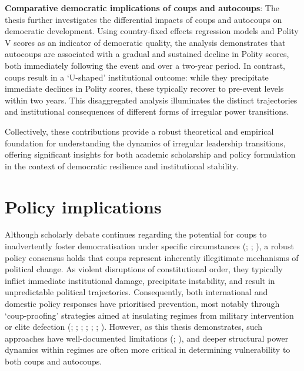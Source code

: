 \documentclass[
  12pt,
]{report}
\begin{document}
\textbf{Comparative democratic implications of coups and autocoups}: The
thesis further investigates the differential impacts of coups and
autocoups on democratic development. Using country-fixed effects
regression models and Polity V scores as an indicator of democratic
quality, the analysis demonstrates that autocoups are associated with a
gradual and sustained decline in Polity scores, both immediately
following the event and over a two-year period. In contrast, coups
result in a `U-shaped' institutional outcome: while they precipitate
immediate declines in Polity scores, these typically recover to
pre-event levels within two years. This disaggregated analysis
illuminates the distinct trajectories and institutional consequences of
different forms of irregular power transitions.

Collectively, these contributions provide a robust theoretical and
empirical foundation for understanding the dynamics of irregular
leadership transitions, offering significant insights for both academic
scholarship and policy formulation in the context of democratic
resilience and institutional stability.

\section{Policy implications}\label{policy-implications}

Although scholarly debate continues regarding the potential for coups to
inadvertently foster democratisation under specific circumstances
(;
;
), a robust policy consensus
holds that coups represent inherently illegitimate mechanisms of
political change. As violent disruptions of constitutional order, they
typically inflict immediate institutional damage, precipitate
instability, and result in unpredictable political trajectories.
Consequently, both international and domestic policy responses have
prioritised prevention, most notably through `coup-proofing' strategies
aimed at insulating regimes from military intervention or elite
defection (;
;
;
;
;
;
). However, as this thesis
demonstrates, such approaches have well-documented limitations
(;
), and deeper structural power
dynamics within regimes are often more critical in determining
vulnerability to both coups and autocoups.
\end{document}
